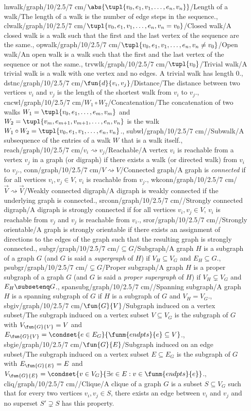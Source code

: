 lnwalk/graph/10/2.5/7 cm/{$\abs{\tupl{v_0,e_1,v_1,\ldots,e_n,v_n}}$}/{Length of a walk}/{The length of a walk is the number of edge steps in the sequence.},
clwalk/graph/10/2.5/7 cm/{$\tupl{v_0,e_1,v_1,\ldots,e_n,v_n=v_0}$}/{Closed walk}/{A closed walk is a walk such that the first and the last vertex of the sequence are the same.},
opwalk/graph/10/2.5/7 cm/{$\tupl{v_0,e_1,v_1,\ldots,e_n,v_n\neq v_0}$}/{Open walk}/{An open walk is a walk such that the first and the last vertex of the sequence or not the same.},
trvwlk/graph/10/2.5/7 cm/{$\tupl{v_0}$}/{Trivial walk}/{A trivial walk is a walk with one vertex and no edges. A trivial walk has length $0$.},
dstnc/graph/10/2.5/7 cm/{$\fun{d}{v_i,v_j}$}/{Distance}/{The distance between two vertices $v_i$ and $v_j$ is the length of the shortest walk from $v_i$ to $v_j$.},
cncwl/graph/10/2.5/7 cm/{$W_1\circ W_2$}/{Concatenation}/{The concatenation of two walks $W_1=\tupl{v_0,e_1,\ldots,e_m,v_m}$ and $W_2=\tupl{v_m,e_{m+1},v_{m+1},\ldots,e_n,v_n}$ is the walk $W_1\circ W_2=\tupl{v_0,e_1,v_1,\ldots,e_n,v_n}$.},
subwl/graph/10/2.5/7 cm/{}/{Subwalk}/{A subsequence of the entries of a walk $W$ that is a walk itself.},
reach/graph/10/2.5/7 cm/{$v_i\rightsquigarrow v_j$}/{Reachable}/{A vertex $v_i$ is reachable from a vertex $v_j$ in a graph (or digraph) if there exists a walk (or directed walk) from $v_i$ to $v_j$.},
conn/graph/10/2.5/7 cm/{$V\rightsquigarrow V$}/{Connected graph}/{A graph is \emph{connected} if for all vertices $v_i,v_j\in V$, $v_i$ is reachable from $v_j$.},
wkconn/graph/10/2.5/7 cm/{$\vec{V}\rightsquigarrow\vec{V}$}/{Weakly connected digraph}/{A digraph is weakly connected if the underlying graph is connected.},
srconn/graph/10/2.5/7 cm/{}/{Strongly connected digraph}/{A digraph is strongly connected if for all vertices $v_i,v_j\in V$, $v_i$ is reachable from $v_j$ and $v_j$ is reachable from $v_i$.},
sror/graph/10/2.5/7 cm/{}/{Strongly orientable}/{A graph is strongly orientable if there exists an assignment of directions to the edges of the graph such that the resulting graph is strongly connected.},
subgr/graph/10/2.5/7 cm/{$\subseteq G$}/{Subgraph}/{A graph $H$ is a subgraph of a graph $G$ (and $G$ is said a \emph{supergraph} of $H$) if $V_H\subseteq V_G$ and $E_H\subseteq G$.},
psubgr/graph/10/2.5/7 cm/{$\subsetneq G$}/{Proper subgraph}/{A graph $H$ is a proper subgraph of a graph $G$ (and $G$ is said a \emph{proper supergraph} of $H$) if $V_H\subsetneq V_G$ and $E_H\subsetenq G$.},
spansubg/graph/10/2.5/7 cm/{}/{Spanning subgraph}/{A graph $H$ is a spanning subgraph of $G$ if $H$ is a subgraph of $G$ and $V_H=V_G$.},
sbgiv/graph/10/2.5/7 cm/{$\fun{G}{V}$}/{Subgraph induced on a vertex subset}/{The subgraph induced on a vertex subset $V\subseteq V_G$ is the subgraph of $G$ with $V_{\fun{G}{V}}=V$ and $E_{\fun{G}{V}}=\condset{e\in E_G}{\funm{endpts}{e}\subseteq V}$.},
sbgie/graph/10/2.5/7 cm/{$\fun{G}{E}$}/{Subgraph induced on an edge subset}/{The subgraph induced on a vertex subset $E\subseteq E_G$ is the subgraph of $G$ with $E_{\fun{G}{E}}=E$ and $V_{\fun{G}{E}}=\condset{v\in V_G}{\exists e\in E:v\in\funm{endpts}{e}}$.},
cliq/graph/10/2.5/7 cm/{}/{Clique}/{A clique of a graph $G$ is a subset $S\subseteq V_G$ such that for every two vertices $v_i,v_j\in S$, there exists an edge between $v_i$ and $v_j$ and no superset $S'\supsetneq S$ has this property.}
